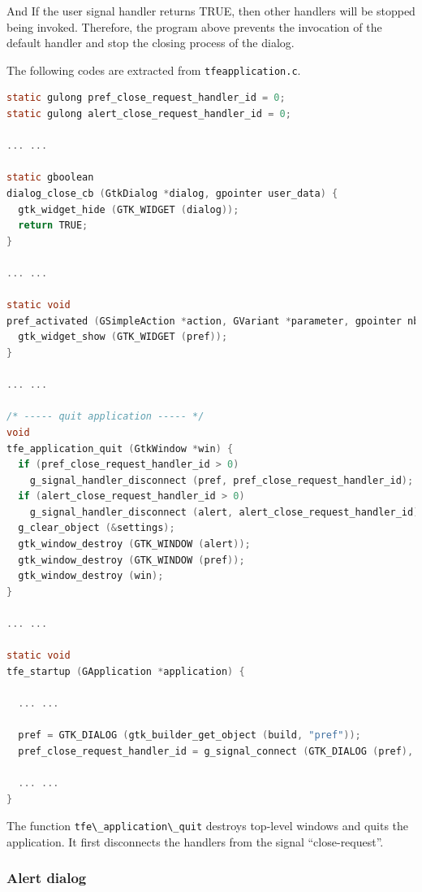 And If the user signal handler returns TRUE, then other handlers will be
stopped being invoked. Therefore, the program above prevents the
invocation of the default handler and stop the closing process of the
dialog.

The following codes are extracted from
\passthrough{\lstinline!tfeapplication.c!}.

\begin{lstlisting}[language=C]
static gulong pref_close_request_handler_id = 0;
static gulong alert_close_request_handler_id = 0;

... ...

static gboolean
dialog_close_cb (GtkDialog *dialog, gpointer user_data) {
  gtk_widget_hide (GTK_WIDGET (dialog));
  return TRUE;
}

... ...

static void
pref_activated (GSimpleAction *action, GVariant *parameter, gpointer nb) {
  gtk_widget_show (GTK_WIDGET (pref));
}

... ...

/* ----- quit application ----- */
void
tfe_application_quit (GtkWindow *win) {
  if (pref_close_request_handler_id > 0)
    g_signal_handler_disconnect (pref, pref_close_request_handler_id);
  if (alert_close_request_handler_id > 0)
    g_signal_handler_disconnect (alert, alert_close_request_handler_id);
  g_clear_object (&settings);
  gtk_window_destroy (GTK_WINDOW (alert));
  gtk_window_destroy (GTK_WINDOW (pref));
  gtk_window_destroy (win);
}

... ...

static void
tfe_startup (GApplication *application) {

  ... ...

  pref = GTK_DIALOG (gtk_builder_get_object (build, "pref"));
  pref_close_request_handler_id = g_signal_connect (GTK_DIALOG (pref), "close-request", G_CALLBACK (dialog_close_cb), NULL);

  ... ... 
}
\end{lstlisting}

The function \passthrough{\lstinline!tfe\_application\_quit!} destroys
top-level windows and quits the application. It first disconnects the
handlers from the signal ``close-request''.

\hypertarget{alert-dialog}{%
\subsubsection{Alert dialog}\label{alert-dialog}}

